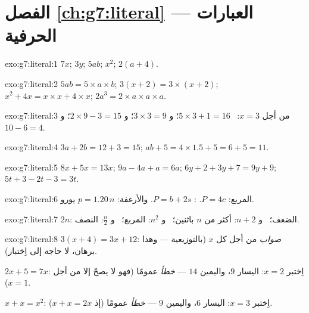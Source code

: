 \section*{الفصل \ref{ch:g7:literal} --- العبارات الحرفية}

\begin{solution}{exo:g7:literal:1}
$7x$; \quad $3y$; \quad $5ab$; \quad $x^2$; \quad $2(a + 4)$.
\end{solution}

\begin{solution}{exo:g7:literal:2}
$5ab = 5 \times a \times b$; \quad
$3(x+2) = 3 \times (x + 2)$; \quad
$x^2 + 4x = x \times x + 4 \times x$; \quad
$2a^3 = 2 \times a \times a \times a$.
\end{solution}

\begin{solution}{exo:g7:literal:3}
من أجل $x = 3$: \ $5 \times 3 + 1 = 16$؛ \quad و $3 \times 3 = 9$؛ \quad
و $2 \times 9 - 3 = 15$؛ \quad و $10 - 6 = 4$.
\end{solution}

\begin{solution}{exo:g7:literal:4}
$3a + 2b = 12 + 3 = 15$; \qquad
$ab + 5 = 4 \times 1.5 + 5 = 6 + 5 = 11$.
\end{solution}

\begin{solution}{exo:g7:literal:5}
$8x + 5x = 13x$; \quad
$9a - 4a + a = 6a$; \quad
$6y + 2 + 3y + 7 = 9y + 9$; \quad
$5t + 3 - 2t - 3 = 3t$.
\end{solution}

\begin{solution}{exo:g7:literal:6}
المربع: $P = 4c$. : $P = b + 2s$. والأرغفة:
$p = 1.20\,n$ يورو.
\end{solution}

\begin{solution}{exo:g7:literal:7}
$2n$: الضعف؛ \ و $n + 2$: أكثر من $n$ باثنين؛ \ و $n^2$: المربع؛
\ و $\frac n2$: النصف.
\end{solution}

\begin{solution}{exo:g7:literal:8}
$3(x+4) = 3x + 12$: \emph{صواب} من أجل كل $x$ (بالتوزيعية ---
وهذا برهان، لا حاجة إلى اِختبار).

$2x + 5 = 7x$: اِختبر $x = 2$: اليسار $9$، واليمين $14$ --- \emph{خطأ}
عمومًا (فهو لا يصحّ إلا من أجل $x = 1$).

$x + x = x^2$: اِختبر $x = 3$: اليسار $6$، واليمين $9$ --- \emph{خطأ}
عمومًا (إذ $x + x = 2x$).
\end{solution}

